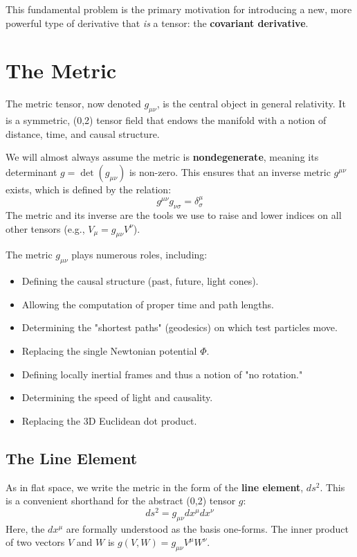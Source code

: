 \documentclass[11pt, a4paper]{report}
\begin{document}
This fundamental problem is the primary motivation for introducing a new, more powerful type of derivative that \emph{is} a tensor: the \textbf{covariant derivative}.

\section{The Metric}

The metric tensor, now denoted $g_{\mu\nu}$, is the central object in general relativity. It is a symmetric, (0,2) tensor field that endows the manifold with a notion of distance, time, and causal structure.

We will almost always assume the metric is \textbf{nondegenerate}, meaning its determinant $g = \det(g_{\mu\nu})$ is non-zero. This ensures that an inverse metric $g^{\mu\nu}$ exists, which is defined by the relation:
\begin{equation}
    g^{\mu\nu} g_{\nu\sigma} = \delta^\mu_\sigma
\end{equation}
The metric and its inverse are the tools we use to raise and lower indices on all other tensors (e.g., $V_\mu = g_{\mu\nu} V^\nu$).

The metric $g_{\mu\nu}$ plays numerous roles, including:
\begin{itemize}
    \item Defining the causal structure (past, future, light cones).
    \item Allowing the computation of proper time and path lengths.
    \item Determining the "shortest paths" (geodesics) on which test particles move.
    \item Replacing the single Newtonian potential $\Phi$.
    \item Defining locally inertial frames and thus a notion of "no rotation."
    \item Determining the speed of light and causality.
    \item Replacing the 3D Euclidean dot product.
\end{itemize}

\subsection*{The Line Element}
As in flat space, we write the metric in the form of the \textbf{line element}, $ds^2$. This is a convenient shorthand for the abstract (0,2) tensor $g$:
\begin{equation}
    ds^2 = g_{\mu\nu} dx^\mu dx^\nu
\end{equation}
Here, the $dx^\mu$ are formally understood as the basis one-forms. The inner product of two vectors $V$ and $W$ is $g(V, W) = g_{\mu\nu}V^\mu W^\nu$.
\end{document}
